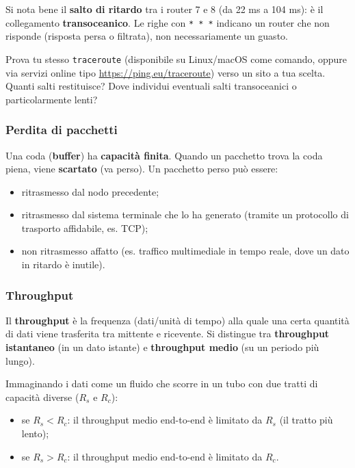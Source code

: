 \documentclass[12pt, a4paper]{article}
\begin{document}
Si nota bene il \textbf{salto di ritardo} tra i router 7 e 8 (da 22 ms a 104 ms): è il collegamento \textbf{transoceanico}. Le righe con \texttt{* * *} indicano un router che non risponde (risposta persa o filtrata), non necessariamente un guasto.

\begin{tcolorbox}[colback=orange!5, colframe=orange!70!black, title=\textbf{Esercizio pratico 1.5}]
Prova tu stesso \texttt{traceroute} (disponibile su Linux/macOS come comando, oppure via servizi online tipo \url{https://ping.eu/traceroute}) verso un sito a tua scelta. Quanti salti restituisce? Dove individui eventuali salti transoceanici o particolarmente lenti?
\end{tcolorbox}

\subsubsection{Perdita di pacchetti}

Una coda (\textbf{buffer}) ha \textbf{capacità finita}. Quando un pacchetto trova la coda piena, viene \textbf{scartato} (va perso). Un pacchetto perso può essere:
\begin{itemize}
    \item ritrasmesso dal nodo precedente;
    \item ritrasmesso dal sistema terminale che lo ha generato (tramite un protocollo di trasporto affidabile, es. TCP);
    \item non ritrasmesso affatto (es. traffico multimediale in tempo reale, dove un dato in ritardo è inutile).
\end{itemize}

\subsubsection{Throughput}

Il \textbf{throughput} è la frequenza (dati/unità di tempo) alla quale una certa quantità di dati viene trasferita tra mittente e ricevente. Si distingue tra \textbf{throughput istantaneo} (in un dato istante) e \textbf{throughput medio} (su un periodo più lungo).

Immaginando i dati come un fluido che scorre in un tubo con due tratti di capacità diverse ($R_s$ e $R_c$):
\begin{itemize}
    \item se $R_s < R_c$: il throughput medio end-to-end è limitato da $R_s$ (il tratto più lento);
    \item se $R_s > R_c$: il throughput medio end-to-end è limitato da $R_c$.
\end{itemize}
\end{document}

